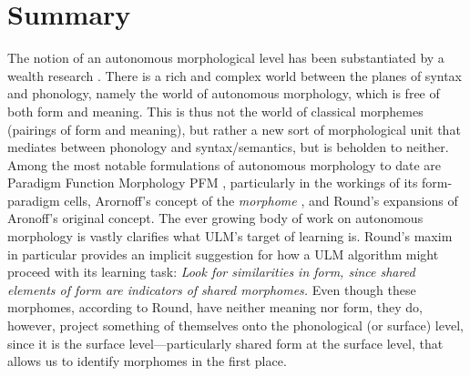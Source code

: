 \section{Summary}\label{sum}
The notion of an autonomous morphological level
has been substantiated by a wealth research \citep[including, e.g.,][]{stump:2001, aronoff:1994, round:2011, round:2015}.
There is a rich and complex 
world between the planes of syntax and phonology, namely the world of autonomous morphology, which is free of both form and meaning. This is thus not the world of classical morphemes (pairings of form and meaning), but rather a new sort of morphological unit that mediates between phonology and
syntax/semantics, but is beholden to neither.  
Among the most notable formulations of autonomous morphology to date are Paradigm Function Morphology \ac{PFM} \citep{stump:2001}, particularly in the workings of its form-paradigm cells, Arornoff's
concept of the \emph{morphome} \citep{aronoff:1994}, and Round's expansions \citep[e.g.,][]{2011,2015,2016} of Aronoff's original concept. The ever growing body of work on autonomous morphology is vastly clarifies what \ac{ULM}'s target of learning is. Round's maxim in particular provides an implicit suggestion for how a \ac{ULM} algorithm might proceed with its learning task: \textit{Look for similarities in form, since shared elements of form are indicators of shared morphomes.} Even though these morphomes, according to Round, have neither meaning nor form, they do, however, project something of themselves onto the phonological (or surface) level, since it is the surface level---particularly shared  form at the surface level, that allows us to identify morphomes in the first place. 